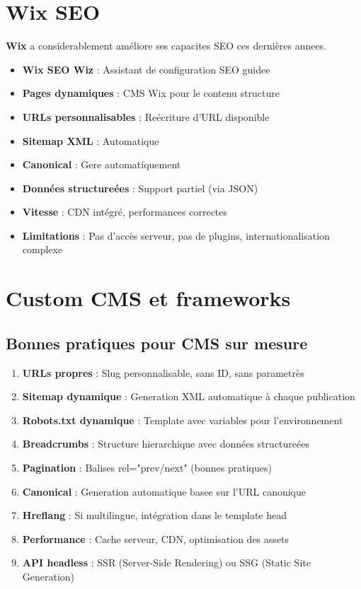 \documentclass[12pt,a4paper,twoside]{report}
\newcommand{\keyword}[1]{\textbf{\textcolor{googleblue}{#1}}}
\begin{document}
\section{Wix SEO}

\keyword{Wix} a considerablement améliore ses capacites SEO ces dernières annees.

\begin{itemize}
    \item \textbf{Wix SEO Wiz} : Assistant de configuration SEO guidee
    \item \textbf{Pages dynamiques} : CMS Wix pour le contenu structure
    \item \textbf{URLs personnalisables} : Reécriture d'URL disponible
    \item \textbf{Sitemap XML} : Automatique
    \item \textbf{Canonical} : Gere automatiquement
    \item \textbf{Données structureées} : Support partiel (via JSON)
    \item \textbf{Vitesse} : CDN intégré, performances correctes
    \item \textbf{Limitations} : Pas d'accès serveur, pas de plugins, internationalisation complexe
\end{itemize}

\section{Custom CMS et frameworks}

\subsection{Bonnes pratiques pour CMS sur mesure}

\begin{enumerate}
    \item \textbf{URLs propres} : Slug personnalisable, sans ID, sans parametrès
    \item \textbf{Sitemap dynamique} : Generation XML automatique à chaque publication
    \item \textbf{Robots.txt dynamique} : Template avec variables pour l'environnement
    \item \textbf{Breadcrumbs} : Structure hierarchique avec données structureées
    \item \textbf{Pagination} : Balises rel="prev/next" (bonnes pratiques)
    \item \textbf{Canonical} : Generation automatique basee sur l'URL canonique
    \item \textbf{Hreflang} : Si multilingue, intégration dans le template head
    \item \textbf{Performance} : Cache serveur, CDN, optimisation des assets
    \item \textbf{API headless} : SSR (Server-Side Rendering) ou SSG (Static Site Generation)
\end{enumerate}
\end{document}
